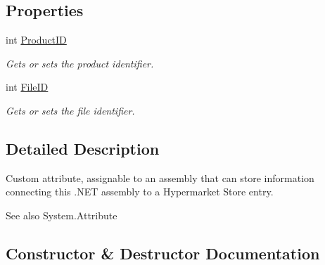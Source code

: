 \subsection*{Properties}
\begin{DoxyCompactItemize}
\item 
int \hyperlink{class_open_1_1_g_i_1_1hypermart_1_1_attributes_1_1_store_attribute_acf647c6eece8333d1d8d817474d5776d}{Product\+ID}
\begin{DoxyCompactList}\small\item\em Gets or sets the product identifier. \end{DoxyCompactList}\item 
int \hyperlink{class_open_1_1_g_i_1_1hypermart_1_1_attributes_1_1_store_attribute_aa321f5e2ab58ed219e952f1e8036fcfa}{File\+ID}
\begin{DoxyCompactList}\small\item\em Gets or sets the file identifier. \end{DoxyCompactList}\end{DoxyCompactItemize}


\subsection{Detailed Description}
Custom attribute, assignable to an assembly that can store information connecting this .N\+ET assembly to a Hypermarket Store entry. 

\begin{DoxySeeAlso}{See also}
System.\+Attribute


\end{DoxySeeAlso}


\subsection{Constructor \& Destructor Documentation}
\hypertarget{class_open_1_1_g_i_1_1hypermart_1_1_attributes_1_1_store_attribute_a127c005e38f149d6c12fda40173ec7f1}{}\label{class_open_1_1_g_i_1_1hypermart_1_1_attributes_1_1_store_attribute_a127c005e38f149d6c12fda40173ec7f1} 
